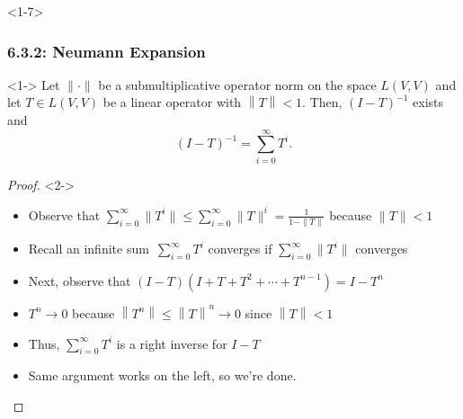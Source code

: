 \documentclass[10pt,english,aspectratio=169]{beamer}
\begin{document}
\begin{frame}<1-7> \frametitle{6.3.2: Neumann Expansion}

\vspace{-1mm}

\begin{theorem}<1->
Let $\| \cdot \|$ be a submultiplicative operator norm on the space $L(V,V)$ and let $T \in L(V,V)$ be a linear operator with $\left\| T \right\| < 1$.
Then, $(I-T)^{-1}$ exists and \vspace{-2mm}
\[ (I-T)^{-1} = \sum_{i=0}^{\infty} T^i. \]
\end{theorem}
\begin{proof}<2->
\begin{itemize}
\item<2-> Observe that $\sum_{i=0}^{\infty} \| T^i \| \leq \sum_{i=0}^{\infty} \| T \|^i = \frac{1}{1-\|T\|}$ because $\|T\|<1$ \vspace{1mm}

\item<3-> Recall an infinite sum $\,\sum_{i=0}^{\infty} T^i$ converges if $\sum_{i=0}^{\infty} \| T^i \|$ converges \vspace{1mm}

\item<4-> Next, observe that $(I - T) \left( I + T + T^2 + \cdots + T^{n-1} \right) = I - T^n $ \vspace{1mm}

\item<5-> $T^n \to 0$ because $ \left\| T^n \right\| \leq \left\| T \right\|^n \rightarrow 0$ since $\left\| T \right\| < 1$ \vspace{1mm}

\item<6-> Thus, $\sum_{i=0}^{\infty} T^i$ is a right inverse for $I-T$ \vspace{1mm}

\item<7-> Same argument works on the left, so we're done. \hfill \qedhere

\end{itemize}
\end{proof}

\end{frame}
\end{document}
